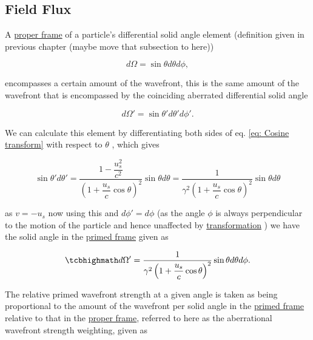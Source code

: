 \subsection{Field Flux} \label{subsect: Field Flux}

A \hyperlink{def-proper-frame}{proper frame} of a particle's differential solid angle element (definition given in previous chapter (maybe move that subsection to here))

\begin{equation}
	d\Omega = \sin{\theta} d\theta d\phi,
\end{equation}

encompasses a certain amount of the wavefront, this is the same amount of the wavefront that is encompassed by the coinciding aberrated differential solid angle

\begin{equation}
	d\Omega{'} = \sin{\theta'} d\theta{'} d\phi{'}.
\end{equation}

We can calculate this element by differentiating both sides of eq.
\eqref{eq: Cosine transform} with respect to $\theta$ \cite{hogg1997special}, which gives

\begin{equation}
	\sin{\theta'} d\theta{'} = \dfrac{1-\dfrac{u_s^2}{{c}^2}}{\left(1 + \dfrac{u_s}{c}\cos{\theta}\right)^2} \sin{\theta} d\theta = \dfrac{1}{{\gamma}^2\left(1 + \dfrac{u_s}{c}\cos{\theta}\right)^2} \sin{\theta} d\theta
\end{equation}

as ${v} =-{u_s}$ now using this and ${d\phi{'}} = {d\phi}$ (as the angle ${\phi}$ is always perpendicular to the motion of the particle and hence unaffected by \hyperlink{def-transform}{transformation} ) we have the solid angle in the \hyperlink{def-Primed-Frame}{primed frame} given as

\begin{equation}
	\mhl{
		d\Omega{'} = \dfrac{1}{{\gamma}^2\left(1 + \dfrac{u_s}{c}\cos{\theta}\right)^2} \sin{\theta} d\theta d\phi.
	}
\end{equation}

The relative primed wavefront strength at a given angle is taken as being proportional to the amount of the wavefront per solid angle in the \hyperlink{def-Primed-Frame}{primed frame} relative to that in the \hyperlink{def-proper-frame}{proper frame}, referred to here as the aberrational wavefront strength weighting, given as

